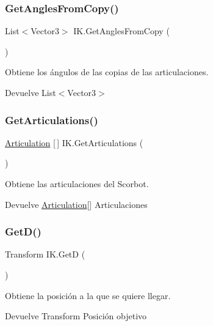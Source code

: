 \subsubsection{\texorpdfstring{GetAnglesFromCopy()}{GetAnglesFromCopy()}}
{\footnotesize\ttfamily List$<$Vector3$>$ I\+K.\+Get\+Angles\+From\+Copy (\begin{DoxyParamCaption}{ }\end{DoxyParamCaption})\hspace{0.3cm}{\ttfamily [inline]}}

Obtiene los ángulos de las copias de las articulaciones. \begin{DoxyReturn}{Devuelve}
List$<$\+Vector3$>$ 
\end{DoxyReturn}
\mbox{\label{class_i_k_ae8f0fe38cdc7d2280fc4c9343176810a}} 
\subsubsection{\texorpdfstring{GetArticulations()}{GetArticulations()}}
{\footnotesize\ttfamily \mbox{\hyperlink{class_articulation}{Articulation}} \mbox{[}$\,$\mbox{]} I\+K.\+Get\+Articulations (\begin{DoxyParamCaption}{ }\end{DoxyParamCaption})\hspace{0.3cm}{\ttfamily [inline]}}

Obtiene las articulaciones del Scorbot. \begin{DoxyReturn}{Devuelve}
\mbox{\hyperlink{class_articulation}{Articulation}}\mbox{[}\mbox{]} Articulaciones 
\end{DoxyReturn}
\mbox{\label{class_i_k_aa7d322903f3e24412e87ec8b8f9281a0}} 
\subsubsection{\texorpdfstring{GetD()}{GetD()}}
{\footnotesize\ttfamily Transform I\+K.\+GetD (\begin{DoxyParamCaption}{ }\end{DoxyParamCaption})\hspace{0.3cm}{\ttfamily [inline]}}

Obtiene la posición a la que se quiere llegar. \begin{DoxyReturn}{Devuelve}
Transform Posición objetivo 
\end{DoxyReturn}
\mbox{\label{class_i_k_a706f81d48d5c7d00791a78b8d09e923e}} 
